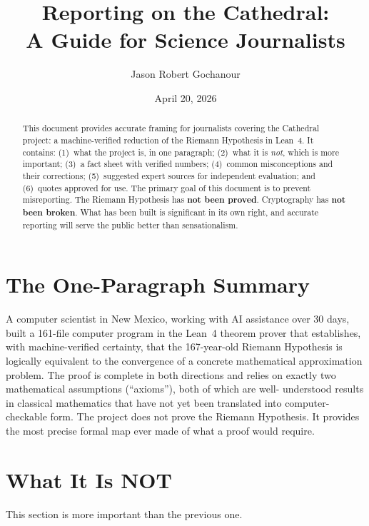 \documentclass[11pt,a4paper]{article}
\title{%
  Reporting on the Cathedral:\\
  A Guide for Science Journalists%
}
\author{
  Jason Robert Gochanour
}
\date{April 20, 2026}
\begin{document}
\maketitle

\begin{abstract}
This document provides accurate framing for journalists covering
the Cathedral project: a machine-verified reduction of the
Riemann Hypothesis in Lean~4. It contains: (1)~what the project
is, in one paragraph; (2)~what it is \emph{not}, which is more
important; (3)~a fact sheet with verified numbers; (4)~common
misconceptions and their corrections; (5)~suggested expert sources
for independent evaluation; and (6)~quotes approved for use.
The primary goal of this document is to prevent misreporting.
The Riemann Hypothesis has \textbf{not been proved}. Cryptography
has \textbf{not been broken}. What has been built is significant
in its own right, and accurate reporting will serve the public
better than sensationalism.
\end{abstract}

\section{The One-Paragraph Summary}

A computer scientist in New Mexico, working with AI assistance over
30 days, built a 161-file computer program in the Lean~4 theorem
prover that establishes, with machine-verified certainty, that the
167-year-old Riemann Hypothesis is logically equivalent to the
convergence of a concrete mathematical approximation problem. The
proof is complete in both directions and relies on exactly two
mathematical assumptions (``axioms''), both of which are well-
understood results in classical mathematics that have not yet been
translated into computer-checkable form. The project does not prove
the Riemann Hypothesis. It provides the most precise formal map ever
made of what a proof would require.

\section{What It Is NOT}
\label{sec:not}

This section is more important than the previous one.
\end{document}
